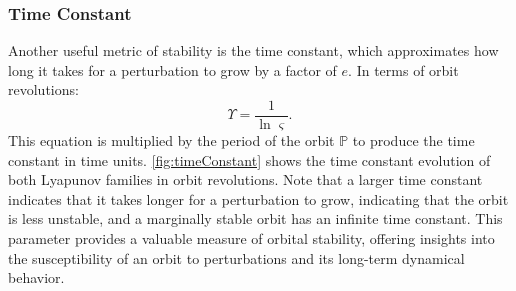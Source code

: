 \subsubsection{Time Constant}
Another useful metric of stability is the time constant, which approximates how long it takes for a
perturbation to grow by a factor of $e$. In terms of orbit revolutions:
\begin{equation}
    \Upsilon=\frac{1}{\ln\varsigma}.
    \label{eq:timeconstant}
\end{equation}
This equation is multiplied by the period of the orbit $\mathbb{P}$ to produce the time constant in
time units. \cref{fig:timeConstant} shows the time constant evolution of both Lyapunov families in
orbit revolutions. Note that a larger time constant indicates that it takes longer for a
perturbation to grow, indicating that the orbit is less unstable, and a marginally stable orbit has
an infinite time constant. This parameter provides a valuable measure of orbital stability,
offering insights into the susceptibility of an orbit to perturbations and its long-term dynamical
behavior.

